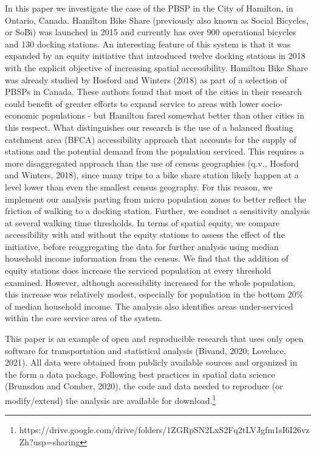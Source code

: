 \documentclass[]{elsarticle} %
\begin{document}
In this paper we investigate the case of the PBSP in the City of
Hamilton, in Ontario, Canada. Hamilton Bike Share (previously also known
as Social Bicycles, or SoBi) was launched in 2015 and currently has over
900 operational bicycles and 130 docking stations. An interesting
feature of this system is that it was expanded by an equity initiative
that introduced twelve docking stations in 2018 with the explicit
objective of increasing spatial accessibility. Hamilton Bike Share was
already studied by Hosford and Winters (2018) as part of a selection of
PBSPs in Canada. These authors found that most of the cities in their
research could benefit of greater efforts to expand service to areas
with lower socio-economic populations - but Hamilton fared somewhat
better than other cities in this respect. What distinguishes our
research is the use of a balanced floating catchment area (BFCA)
accessibility approach that accounts for the supply of stations and the
potential demand from the population serviced. This requires a more
disaggregated approach than the use of census geographies (q.v., Hosford
and Winters, 2018), since many trips to a bike share station likely
happen at a level lower than even the smallest census geography. For
this reason, we implement our analysis parting from micro population
zones to better reflect the friction of walking to a docking station.
Further, we conduct a sensitivity analysis at several walking time
thresholds. In terms of spatial equity, we compare accessibility with
and without the equity stations to assess the effect of the initiative,
before reaggregating the data for further analysis using median
household income information from the census. We find that the addition
of equity stations does increase the serviced population at every
threshold examined. However, although accessibility increased for the
whole population, this increase was relatively modest, especially for
population in the bottom 20\% of median household income. The analysis
also identifies areas under-serviced within the core service area of the
system.

This paper is an example of open and reproducible research that uses
only open software for transportation and statistical analysis (Bivand,
2020; Lovelace, 2021). All data were obtained from publicly available
sources and organized in the form a data package. Following best
practices in spatial data science (Brunsdon and Comber, 2020), the code
and data needed to reproduce (or modify/extend) the analysis are
available for download.\footnote{https://drive.google.com/drive/folders/1ZGRpSN2LxS2Fq2tLVJgfm1sI6I26vzZh?usp=sharing}
\end{document}
